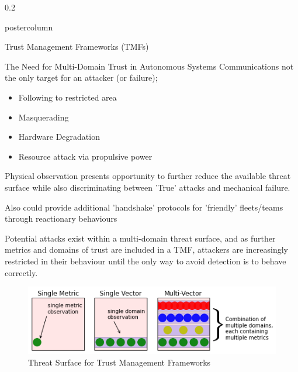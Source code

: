 \documentclass[final,hyperref={pdfpagelabels=false}]{beamer}
\def\colwidth{0.2\linewidth}
\begin{document}
\begin{frame}[fragile]
\begin{columns}[T]
\begin{column}{\colwidth}
\begin{beamercolorbox}[center,wd=\textwidth]{postercolumn}
\begin{minipage}[T]{.98\textwidth}
{\begin{block}{Trust Management Frameworks (TMFs)}
          \end{block}
          \begin{block}{The Need for Multi-Domain Trust in Autonomous Systems}
              Communications not the only target for an attacker (or failure);
                \begin{itemize}
                  \item Following to restricted area
                  \item Masquerading
                  \item Hardware Degradation
                  \item Resource attack via propulsive power
                \end{itemize}
            Physical observation presents opportunity to further reduce the available threat surface while also discriminating between 'True' attacks and mechanical failure.
              
            \vspace{0.3\baselineskip}

            Also could provide additional 'handshake' protocols for 'friendly' fleets/teams through reactionary behaviours

            \vspace{0.3\baselineskip}

            Potential attacks exist within a multi-domain threat surface, and as further metrics and domains of trust are included in a TMF, attackers are increasingly restricted in their behaviour until the only way to avoid detection is to behave correctly.
            \begin{figure}[h]
              \centering
              \includegraphics[width=0.9\linewidth]{threat_surface_sum}
              \caption{Threat Surface for Trust Management Frameworks}
            \end{figure}
          \end{block}

}
\end{minipage}
\end{beamercolorbox}
\end{column}
\end{columns}
\end{frame}
\end{document}
